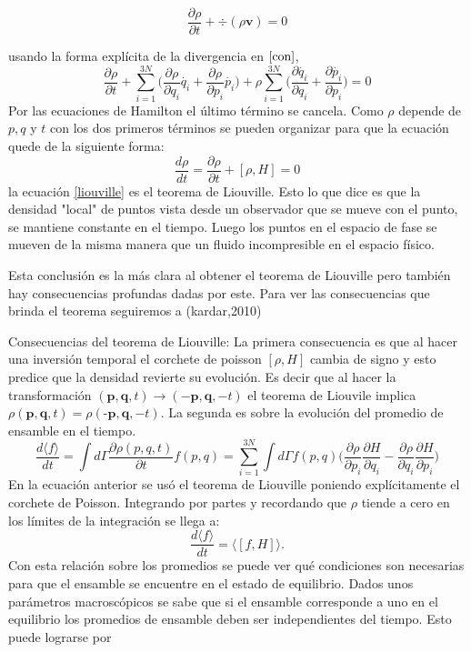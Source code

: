 \begin{equation} \label{con}
 \frac{\partial \rho}{\partial t} + \div{ ( \rho\mathbf{v} ) }=0
\end{equation}

usando la forma explícita de la divergencia en $\ref{con}$,
\begin{equation}
 \frac{\partial \rho}{\partial t} +\sum_{i=1}^{3N} \Big( \frac{\partial\rho}{\partial q_{i}}\dot{q_{i}}+  \frac{\partial\rho}{\partial p_{i}}\dot{p_{i}} \Big) + \rho \sum_{i=1}^{3N} \Big( \frac{\partial \dot{q_{i}}}{\partial q_{i}} + \frac{\partial \dot{p_{i}}}{\partial p_{i}}\Big)=0
\end{equation}
Por las ecuaciones de Hamilton el último término se cancela. Como $\rho$ depende de $p,q$ y $t$ con los dos primeros términos se pueden organizar para que la ecuación quede de la siguiente forma:
\begin{equation} \label{liouville}
\frac{d \rho}{dt}= \frac{\partial \rho}{\partial t} + [ \rho, H ]=0
\end{equation}
la ecuación \ref{liouville} es el teorema de Liouville. Esto lo que dice es que la densidad "local" de puntos vista desde un observador que se mueve con el punto, se mantiene constante en el tiempo. Luego los puntos en el espacio de fase se mueven de la misma manera que un fluido incompresible en el espacio físico.

Esta conclusión es la más clara al obtener el teorema de Liouville pero también hay consecuencias profundas dadas por este. Para ver las consecuencias que brinda el teorema seguiremos a (kardar,2010) 

Consecuencias del teorema de Liouville: La primera consecuencia es que al hacer una inversión temporal el corchete de poisson $[\rho, H]$ cambia de signo y esto predice que la densidad revierte su evolución. Es decir que al hacer la transformación $(\textbf{p},\textbf{q},t) \to (-\textbf{p},\textbf{q},-t)$ el teorema de Liouvile implica $\rho(\textbf{p},\textbf{q},t)=\rho(\textbf{-p},\textbf{q},-t)$.
La segunda es sobre la evolución del promedio de ensamble en el tiempo.
\begin{equation}
\frac{d \langle f \rangle}{dt}= \int d \Gamma \frac{\partial \rho(p,q,t)}{\partial t} f(p,q)= \sum_{i=1}^{3N} \int d\Gamma f(p,q) \Big( \frac{\partial \rho}{\partial p_{i}}\frac{\partial H}{\partial q_{i}} - \frac{\partial \rho}{\partial q_{i}}\frac{\partial H}{\partial p_{i}}  \Big)
\end{equation}
En la ecuación anterior se usó el teorema de Liouville poniendo explícitamente el corchete de Poisson. Integrando por partes y recordando que $\rho$ tiende a cero en los límites de la integración se llega a:
\begin{equation}
\frac{d \langle f \rangle}{dt}= \langle [ f,H] \rangle.
\end{equation}
Con esta relación sobre los promedios se puede ver qué condiciones son necesarias para que el ensamble se encuentre en el estado de equilibrio. Dados unos parámetros macroscópicos se sabe que si el ensamble corresponde a uno en el equilibrio los promedios de ensamble deben ser independientes del tiempo. Esto puede lograrse por
 

